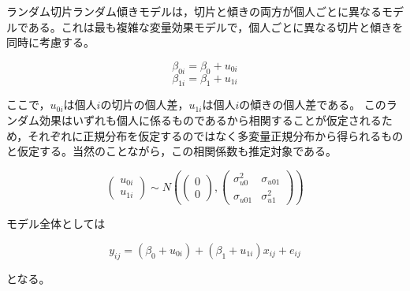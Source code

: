 \documentclass[
  a4paper,
]{ltjsbook}
\begin{document}
ランダム切片ランダム傾きモデルは，切片と傾きの両方が個人ごとに異なるモデルである。これは最も複雑な変量効果モデルで，個人ごとに異なる切片と傾きを同時に考慮する。

\[
\beta_{0i} = \beta_0 + u_{0i}
\] \[
\beta_{1i} = \beta_1 + u_{1i}
\]

ここで，\(u_{0i}\)は個人\(i\)の切片の個人差，\(u_{1i}\)は個人\(i\)の傾きの個人差である。
このランダム効果はいずれも個人に係るものであるから相関することが仮定されるため，それぞれに正規分布を仮定するのではなく多変量正規分布から得られるものと仮定する。当然のことながら，この相関係数も推定対象である。

\[
\begin{pmatrix} u_{0i} \\ u_{1i} \end{pmatrix} \sim N\left( \begin{pmatrix} 0 \\ 0 \end{pmatrix}, \begin{pmatrix} \sigma_{u0}^2 & \sigma_{u01} \\ \sigma_{u01} & \sigma_{u1}^2 \end{pmatrix} \right)
\]

モデル全体としては

\[
y_{ij} = (\beta_0 + u_{0i}) + (\beta_1 + u_{1i}) x_{ij} + e_{ij}
\]

となる。
\end{document}
